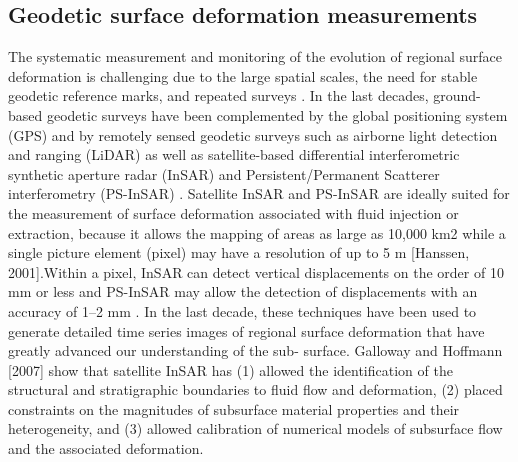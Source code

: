 \documentclass[11pt,final]{article}%
\renewcommand{\citep}{\cite}
\begin{document}
\subsection{Geodetic surface deformation measurements}
The systematic measurement and monitoring of the evolution of regional surface deformation is challenging due to the large spatial scales, the need for stable geodetic reference marks, and repeated surveys \citep{Galloway2011a}. In the last decades, ground-based geodetic surveys have been complemented by the global positioning system (GPS) and by remotely sensed geodetic surveys such as airborne light detection and ranging (LiDAR) as well as satellite-based differential interferometric synthetic aperture radar (InSAR) \citep{Galloway1998,Burgmann2000} and Persistent/Permanent Scatterer interferometry (PS-InSAR) \citep{Ferretti2001}. Satellite InSAR and PS-InSAR are ideally suited for the measurement of surface deformation associated with fluid injection or extraction, because it allows the mapping of areas as large as 10,000 km2 while a single picture element (pixel) may have a resolution of up to 5 m [Hanssen, 2001].Within a pixel, InSAR can detect vertical displacements on the order of 10 mm or less and PS-InSAR may allow the detection of displacements with an accuracy of 1–2 mm \citep{Ferretti2001}. In the last decade, these techniques have been used to generate detailed time series images of regional surface deformation that have greatly advanced our understanding of the sub- surface. Galloway and Hoffmann [2007] \cite{Galloway2006a} show that satellite InSAR has (1) allowed the identification of the structural and stratigraphic boundaries to fluid flow and deformation, (2) placed constraints on the magnitudes of subsurface material properties and their heterogeneity, and (3) allowed calibration of numerical models of subsurface flow and the associated deformation.
\end{document}
